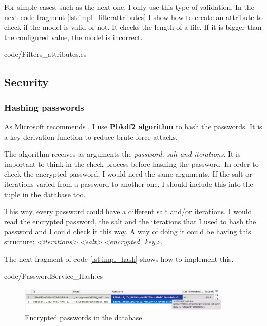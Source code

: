             For simple cases, such as the next one, I only use this type of validation. 
            In the next code fragment \ref{lst:impl_filterattributes} I show how to create an attribute to check if the model is valid or not. 
            It checks the length of a file. If it is bigger than the configured value, the model is incorrect.

            
            {code/Filters_attributes.cs}

    \subsection{Security}
        \subsubsection{Hashing passwords}
            As Microsoft recommends \cite{Hash}, I use \textbf{Pbkdf2 algorithm} to hash the passwords. It is a key derivation function to reduce brute-force attacks.

            The algorithm receives as arguments the \textit{password, salt and iterations}. It is important to think in the check process before hashing the password.
            In order to check the encrypted password, I would need the same arguments. If the salt or iterations varied from a password to another one, I should include this into the tuple in the database too. 
            
            This way, every password could have a different salt and/or iterations. I would read the encrypted password, the salt and the iterations that I used to hash the password and I could check it this way.
            A way of doing it could be having this structure: \textit{<iterations>.<salt>.<encrypted\_key>}.
            
            The next fragment of code \ref{lst:impl_hash} shows how to implement this.

            
            {code/PasswordService_Hash.cs}

            \begin{figure}[H]
                \centering
                    \includegraphics[width=0.9\textwidth]{assets/users_database.png}
                \caption{Encrypted passwords in the database}
                \label{fig:user_database}
            \end{figure}

